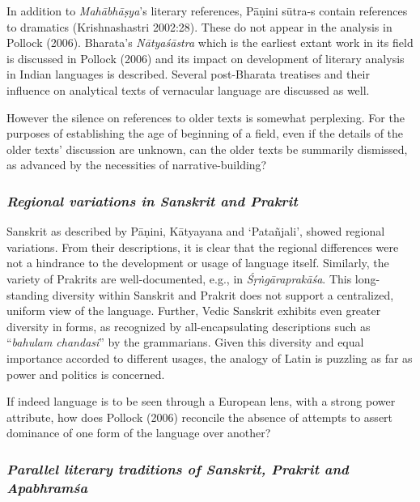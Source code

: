 In addition to {\sl Mahābhāṣya}’s literary references, Pāṇini sūtra-s contain references to dramatics (Krishnashastri 2002:28). These do not appear in the analysis in Pollock (2006). Bharata’s {\sl Nātyaśāstra} which is the earliest extant work in its field is discussed in Pollock (2006) and its impact on development of literary analysis in Indian languages is described. Several post-Bharata treatises and their influence on analytical texts of vernacular language are discussed as well.

However the silence on references to older texts is somewhat perplexing. For the purposes of establishing the age of beginning of a field, even if the details of the older texts’ discussion are unknown, can the older texts be summarily dismissed, as advanced by the necessities of narrative-building?

\subsubsection{{\sl Regional variations in Sanskrit and Prakrit}}

Sanskrit as described by Pāṇini, Kātyayana and `Patañjali', showed regional variations. From their descriptions, it is clear that the regional differences were not a hindrance to the development or usage of language itself. Similarly, the variety of Prakrits are well-documented, e.g., in {\sl Śṛṅgāraprakāśa}. This long-standing diversity within Sanskrit and Prakrit does not support a centralized, uniform view of the language. Further, Vedic Sanskrit exhibits even greater diversity in forms, as recognized by all-encapsulating descriptions such as “{\sl bahulam chandasi}” by the grammarians. Given this diversity and equal importance accorded to different usages, the analogy of Latin is puzzling as far as power and politics is concerned. 

If indeed language is to be seen through a European lens, with a strong power attribute, how does Pollock (2006) reconcile the absence of attempts to assert dominance of one form of the language over another? 
\vskip -40pt

\subsubsection{{\sl Parallel literary traditions of Sanskrit, Prakrit and Apabhramśa}}
\vskip -5pt


